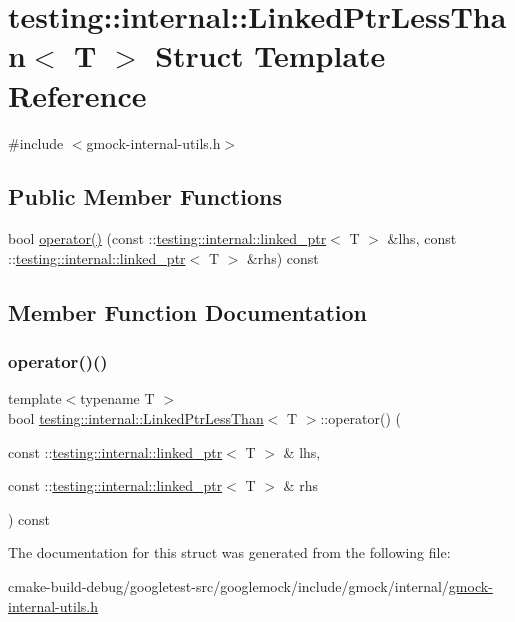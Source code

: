 \hypertarget{structtesting_1_1internal_1_1LinkedPtrLessThan}{}\section{testing\+::internal\+::Linked\+Ptr\+Less\+Than$<$ T $>$ Struct Template Reference}
\label{structtesting_1_1internal_1_1LinkedPtrLessThan}


{\ttfamily \#include $<$gmock-\/internal-\/utils.\+h$>$}

\subsection*{Public Member Functions}
\begin{DoxyCompactItemize}
\item 
bool \mbox{\hyperlink{structtesting_1_1internal_1_1LinkedPtrLessThan_a0614293c43e51b280a870ab117355164}{operator()}} (const \+::\mbox{\hyperlink{classtesting_1_1internal_1_1linked__ptr}{testing\+::internal\+::linked\+\_\+ptr}}$<$ T $>$ \&lhs, const \+::\mbox{\hyperlink{classtesting_1_1internal_1_1linked__ptr}{testing\+::internal\+::linked\+\_\+ptr}}$<$ T $>$ \&rhs) const
\end{DoxyCompactItemize}


\subsection{Member Function Documentation}
\mbox{\label{structtesting_1_1internal_1_1LinkedPtrLessThan_a0614293c43e51b280a870ab117355164}} 
\subsubsection{\texorpdfstring{operator()()}{operator()()}}
{\footnotesize\ttfamily template$<$typename T $>$ \\
bool \mbox{\hyperlink{structtesting_1_1internal_1_1LinkedPtrLessThan}{testing\+::internal\+::\+Linked\+Ptr\+Less\+Than}}$<$ T $>$\+::operator() (\begin{DoxyParamCaption}\item[{const \+::\mbox{\hyperlink{classtesting_1_1internal_1_1linked__ptr}{testing\+::internal\+::linked\+\_\+ptr}}$<$ T $>$ \&}]{lhs,  }\item[{const \+::\mbox{\hyperlink{classtesting_1_1internal_1_1linked__ptr}{testing\+::internal\+::linked\+\_\+ptr}}$<$ T $>$ \&}]{rhs }\end{DoxyParamCaption}) const\hspace{0.3cm}{\ttfamily [inline]}}



The documentation for this struct was generated from the following file\+:\begin{DoxyCompactItemize}
\item 
cmake-\/build-\/debug/googletest-\/src/googlemock/include/gmock/internal/\mbox{\hyperlink{gmock-internal-utils_8h}{gmock-\/internal-\/utils.\+h}}\end{DoxyCompactItemize}
